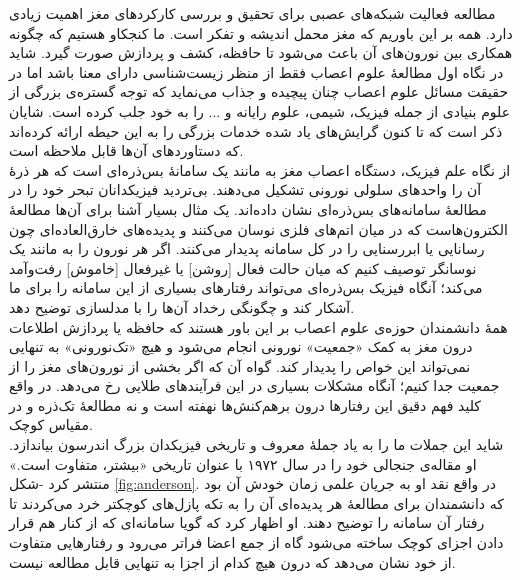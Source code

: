 مطالعه فعالیت شبکه‌های عصبی برای تحقیق و بررسی کارکردهای مغز اهمیت زیادی دارد. همه بر این باوریم که مغز محمل اندیشه و تفکر است. ما کنجکاو هستیم که چگونه همکاری بین نورون‌های آن باعث می‌شود تا حافظه، کشف و پردازش صورت گیرد. شاید در نگاه اول مطالعهٔ علوم اعصاب فقط از منظر زیست‌شناسی دارای معنا باشد اما در حقیقت مسائل علوم اعصاب چنان پیچیده و جذاب می‌نماید که توجه گستره‌ی بزرگی از علوم بنیادی از جمله فیزیک، شیمی، علوم رایانه و ... را به خود جلب کرده است. شایان ذکر است که تا کنون گرایش‌های یاد شده خدمات بزرگی را به این حیطه‌ ارائه کرده‌اند که دستاوردهای آن‌ها قابل ملاحظه است.\\

از نگاه علم فیزیک، دستگاه اعصاب مغز به مانند یک سامانهٔ بس‌ذره‌ای است که هر ذرهٔ آن را واحدهای سلولی نورونی تشکیل می‌دهند. بی‌تردید فیزیکدانان تبحر خود را در مطالعهٔ سامانه‌های بس‌ذره‌ای نشان داده‌اند. یک مثال بسیار آشنا برای آن‌ها مطالعهٔ الکترون‌هاست که در میان اتم‌های فلزی نوسان می‌کنند و پدیده‌های خارق‌العاده‌ای چون رسانایی یا ابررسنایی را در کل سامانه پدیدار می‌کنند. اگر هر نورون را به مانند یک نوسانگر توصیف کنیم که میان حالت فعال [روشن] یا غیرفعال [خاموش] رفت‌وآمد می‌کند؛ آنگاه فیزیک بس‌ذره‌ای می‌تواند رفتارهای بسیاری از این سامانه را برای ما آشکار کند و چگونگی رخداد آن‌ها را با مدلسازی توضیح دهد.\\

همهٔ دانشمندان حوزه‌ی علوم اعصاب بر این باور هستند که حافظه یا پردازش اطلاعات درون مغز به کمک «جمعیت» نورونی انجام می‌شود و هیچ «تک‌نورونی» به تنهایی نمی‌تواند این خواص را پدیدار کند. گواه آن که اگر بخشی از نورون‌های مغز را از جمعیت جدا کنیم؛ آنگاه مشکلات بسیاری در این فرآیندهای طلایی رخ می‌دهد. در واقع کلید فهم دقیق این رفتارها درون برهم‌کنش‌ها نهفته است و نه مطالعهٔ تک‌ذره و در مقیاس کوچک.\\

شاید این جملات ما را به یاد جملهٔ معروف و تاریخی فیزیکدان بزرگ اندرسون بیاندازد. او مقاله‌ی جنجالی خود را در سال ۱۹۷۲ با عنوان تاریخی «بیشتر، متفاوت است.» منتشر کرد -شکل \ref{fig:anderson}. در واقع نقد او به جریان علمی زمان خودش آن بود که دانشمندان برای مطالعهٔ هر پدیده‌ای آن را به تکه ‌پازل‌های کوچکتر خرد می‌کردند تا رفتار آن سامانه را توضیح دهند. او اظهار کرد که گویا سامانه‌ای که از کنار هم قرار دادن اجزای کوچک ساخته می‌شود گاه از جمع اعضا فراتر می‌رود و رفتارهایی متفاوت از خود نشان می‌دهد که درون هیچ کدام از اجزا به تنهایی قابل مطالعه نیست.\\


